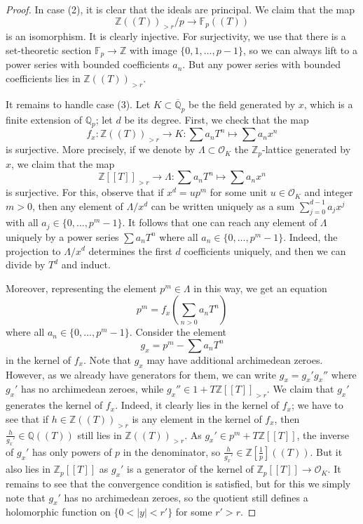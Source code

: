 \documentclass[11pt]{amsbook}
\numberwithin{equation}{section}
\numberwithin{theorem}{section}
\theoremstyle{definition}
\begin{document}
\begin{proof}
In case (2), it is clear that the ideals are principal. We claim that the map
\[
\mathbb Z((T))_{>r}/p\to \mathbb F_p((T))
\]
is an isomorphism. It is clearly injective. For surjectivity, we use that there is a set-theoretic section $\mathbb F_p\to \mathbb Z$ with image $\{0,1,\ldots,p-1\}$, so we can always lift to a power series with bounded coefficients $a_n$. But any power series with bounded coefficients lies in $\mathbb Z((T))_{>r}$.

It remains to handle case (3). Let $K\subset \overline{\mathbb Q}_p$ be the field generated by $x$, which is a finite extension of $\mathbb Q_p$; let $d$ be its degree. First, we check that the map
\[
f_x: \mathbb Z((T))_{>r}\to K: \sum a_n T^n\mapsto \sum a_n x^n
\]
is surjective. More precisely, if we denote by $\Lambda\subset \mathcal O_K$ the $\mathbb Z_p$-lattice generated by $x$, we claim that the map
\[
\mathbb Z[[T]]_{>r}\to \Lambda: \sum a_n T^n\mapsto \sum a_n x^n
\]
is surjective. For this, observe that if $x^d=up^m$ for some unit $u\in \mathcal O_K$ and integer $m>0$, then any element of $\Lambda/x^d$ can be written uniquely as a sum $\sum_{j=0}^{d-1} a_j x^j$ with all $a_j\in \{0,\ldots,p^m-1\}$. It follows that one can reach any element of $\Lambda$ uniquely by a power series $\sum a_n T^n$ where all $a_n\in \{0,\ldots,p^m-1\}$. Indeed, the projection to $\Lambda/x^d$ determines the first $d$ coefficients uniquely, and then we can divide by $T^d$ and induct.

Moreover, representing the element $p^m\in \Lambda$ in this way, we get an equation
\[
p^m = f_x(\sum_{n>0} a_n T^n)
\]
where all $a_n\in \{0,\ldots,p^m-1\}$. Consider the element
\[
g_x = p^m - \sum a_n T^n
\]
in the kernel of $f_x$. Note that $g_x$ may have additional archimedean zeroes. However, as we already have generators for them, we can write $g_x=g_x' g_x''$ where $g_x'$ has no archimedean zeroes, while $g_x''\in 1+T\mathbb Z[[T]]_{>r}$. We claim that $g_x'$ generates the kernel of $f_x$. Indeed, it clearly lies in the kernel of $f_x$; we have to see that if $h\in \mathbb Z((T))_{>r}$ is any element in the kernel of $f_x$, then $\frac{h}{g_x'}\in \mathbb Q((T))$ still lies in $\mathbb Z((T))_{>r}$. As $g_x'\in p^m + T\mathbb Z[[T]]$, the inverse of $g_x'$ has only powers of $p$ in the denominator, so $\frac{h}{g_x'}\in \mathbb Z[\tfrac 1p]((T))$. But it also lies in $\mathbb Z_p[[T]]$ as $g_x'$ is a generator of the kernel of $\mathbb Z_p[[T]]\to \mathcal O_K$. It remains to see that the convergence condition is satisfied, but for this we simply note that $g_x'$ has no archimedean zeroes, so the quotient still defines a holomorphic function on $\{0<|y|<r'\}$ for some $r'>r$.


\end{proof}
\end{document}
